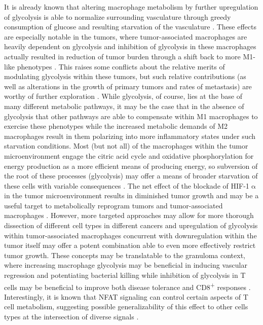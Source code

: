 It is already known that altering macrophage metabolism by further upregulation of glycolysis is able to normalize surrounding vasculature through greedy consumption of glucose and resulting starvation of the vasculature \citep{Wenes2016}. These effects are especially notable in the tumors, where tumor-associated macrophages are heavily dependent on glycolysis and inhibition of glycolysis in these macrophages actually resulted in reduction of tumor burden through a shift back to more M1-like phenotypes \citep{Mehla2019, Rabold2017}. This raises some conflicts about the relative merits of modulating glycolysis within these tumors, but such relative contributions (as well as alterations in the growth of primary tumors and rates of metastasis) are worthy of further exploration \citep{Mojsilovic2021}. While glycolysis, of course, lies at the base of many different metabolic pathways, it may be the case that in the absence of glycolysis that other pathways are able to compensate within M1 macrophages to exercise these phenotypes while the increased metabolic demands of M2 macrophages result in them polarizing into more inflammatory states under such starvation conditions. Most (but not all) of the macrophages within the tumor microenvironment engage the citric acid cycle and oxidative phosphorylation for energy production as a more efficient means of producing energy, so subversion of the root of these processes (glycolysis) may offer a means of broader starvation of these cells with variable consequences \citep{Geeraerts2021, Yu2020, Puthenveetil2020}. The net effect of the blockade of HIF-1$\upalpha$ in the tumor microenvironment results in diminished tumor growth and may be a useful target to metabolically reprogram tumors and tumor-associated macrophages \citep{Hong2004}. However, more targeted approaches may allow for more thorough dissection of different cell types in different cancers and upregulation of glycolysis within tumor-associated macrophages concurrent with downregulation within the tumor itself may offer a potent combination able to even more effectively restrict tumor growth. These concepts may be translatable to the granuloma context, where increasing macrophage glycolysis may be beneficial in inducing vascular regression and potentiating bacterial killing while inhibition of glycolysis in T cells may be beneficial to improve both disease tolerance and CD8\textsuperscript{+} responses \citep{Phan2017, Russell2019b, Tzelepis2018, Wik2022}. Interestingly, it is known that NFAT signaling can control certain aspects of T cell metabolism, suggesting possible generalizability of this effect to other cells types at the intersection of diverse signals \citep{Vaeth2018}.

